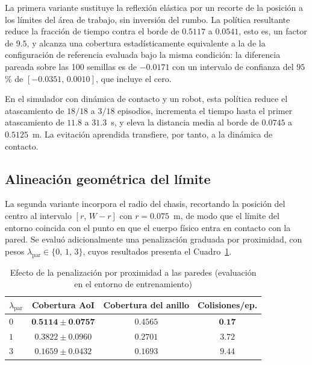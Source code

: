 La primera variante sustituye la reflexión elástica por un recorte de la
posición a los límites del área de trabajo, sin inversión del rumbo. La
política resultante reduce la fracción de tiempo contra el borde de $0{.}5117$
a $0{.}0541$, esto es, un factor de $9{.}5$, y alcanza una cobertura
estadísticamente equivalente a la de la configuración de referencia evaluada
bajo la misma condición: la diferencia pareada sobre las 100 semillas es de
$-0{.}0171$ con un intervalo de confianza del $95$\,\% de
$[-0{.}0351,\, 0{.}0010]$, que incluye el cero.

En el simulador con dinámica de contacto y un robot, esta política reduce el
atascamiento de $18/18$ a $3/18$ episodios, incrementa el tiempo hasta el
primer atascamiento de $11{.}8$ a $31{.}3$~s, y eleva la distancia media al
borde de $0{.}0745$ a $0{.}5125$~m. La evitación aprendida transfiere, por
tanto, a la dinámica de contacto.

\subsection*{Alineación geométrica del límite}

La segunda variante incorpora el radio del chasis, recortando la posición del
centro al intervalo $[r,\, W-r]$ con $r = 0{.}075$~m, de modo que el límite
del entorno coincida con el punto en que el cuerpo físico entra en contacto
con la pared. Se evaluó adicionalmente una penalización graduada por
proximidad, con pesos $\lambda_{\text{par}} \in \{0,\, 1,\, 3\}$, cuyos resultados presenta
el Cuadro~\ref{tab:barrido_lambda_pared}.

\begin{table}[h]
    \centering\captionsetup{width=0.85\linewidth}
    \caption{Efecto de la penalización por proximidad a las paredes
             (evaluación en el entorno de entrenamiento)}
    \begin{tabular}{lccc}
        $\lambda_{\text{par}}$ & \textbf{Cobertura AoI} &
        \textbf{Cobertura del anillo} & \textbf{Colisiones/ep.} \\
        \hline
        $0$ & $\mathbf{0{.}5114 \pm 0{.}0757}$ & $0{.}4565$
            & $\mathbf{0{.}17}$ \\
        $1$ & $0{.}3822 \pm 0{.}0960$ & $0{.}2701$ & $3{.}72$ \\
        $3$ & $0{.}1659 \pm 0{.}0432$ & $0{.}1693$ & $9{.}44$ \\
    \end{tabular}
    \label{tab:barrido_lambda_pared}
\end{table}

